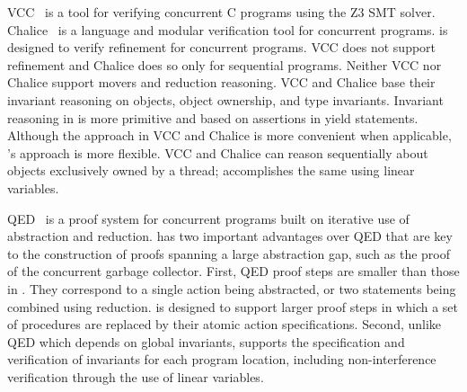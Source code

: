 

VCC~\cite{VCC} is a tool for verifying concurrent C programs using the Z3 SMT solver.  
Chalice~\cite{LM09} is a language and modular verification tool for concurrent programs. 
\civl is designed to verify refinement for concurrent programs.  
VCC does not support refinement and Chalice does so only for sequential programs. 
Neither VCC nor Chalice support movers and reduction reasoning.
VCC and Chalice base their invariant reasoning on objects, object ownership, and type invariants. 
Invariant reasoning in \civl is more primitive and based on assertions in yield statements. 
Although the approach in VCC and Chalice is more convenient when applicable, \civl's approach is more flexible. 
VCC and Chalice can reason sequentially about objects exclusively owned by a thread;
\civl accomplishes the same using linear variables.

QED~\cite{ElmasQT09} is a proof system for concurrent programs built on iterative use of abstraction and reduction. 
\civl has two important advantages over QED that are key to 
the construction of proofs spanning a large abstraction gap, such as the proof of the concurrent garbage collector.
First, QED proof steps are smaller than those in \civl. 
They correspond to a single action being abstracted, or two statements being combined using reduction. 
\civl is designed to support larger proof steps in which a set of procedures are replaced by their atomic action specifications. 
Second, unlike QED which depends on global invariants, 
\civl supports the specification and verification of invariants for each program location, 
including non-interference verification through the use of linear variables. 

